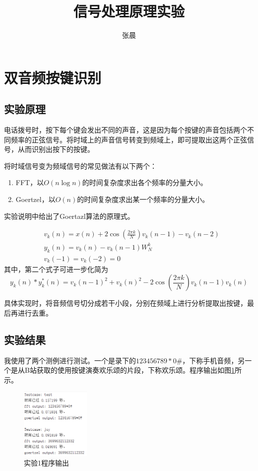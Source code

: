 \documentclass{article}
\title{信号处理原理实验}
\author{张晨}
\begin{document}
\maketitle

\section{双音频按键识别}
\subsection{实验原理}
电话拨号时，按下每个键会发出不同的声音，这是因为每个按键的声音包括两个不同频率的正弦信号。将时域上的声音信号转变到频域上，即可提取出这两个正弦信号，从而识别出按下的按键。

将时域信号变为频域信号的常见做法有以下两个：
\begin{enumerate}
    \item FFT，以$O(n\log n)$的时间复杂度求出各个频率的分量大小。
    \item Goertzel，以$O(n)$的时间复杂度求出某一个频率的分量大小。
\end{enumerate}
实验说明中给出了Goertazl算法的原理式。

\begin{equation}
\begin{aligned}
&v_{k}(n)=x(n)+2 \cos \left(\frac{2 \pi k}{N}\right) v_{k}(n-1)-v_{k}(n-2)\\
&y_{k}(n)=v_{k}(n)-v_{k}(n-1) W_{N}^{k}\\
&v_{k}(-1)=v_{k}(-2)=0
\end{aligned}
\end{equation}
其中，第二个式子可进一步化简为
\begin{equation}
    y_{k}(n) * y^*_{k}(n)=v_k(n-1)^2 + v_{k}(n)^2 - 2\cos \left(\frac{2 \pi k}{N}\right) v_{k}(n-1) v_k(n)
\end{equation}

具体实现时，将音频信号切分成若干小段，分别在频域上进行分析提取出按键，最后再进行去重。

\subsection{实验结果}
我使用了两个测例进行测试。一个是录下的$123456789*0\#$，下称手机音频，另一个是从B站获取的使用按键演奏欢乐颂的片段，下称欢乐颂。程序输出如图\ref{fig:1-output}所示。
\begin{figure}
    \centering
    \includegraphics[width = 0.3\textwidth]{problem1/output.png}
    \caption{实验1程序输出}
    \label{fig:1-output}
\end{figure}
\end{document}
